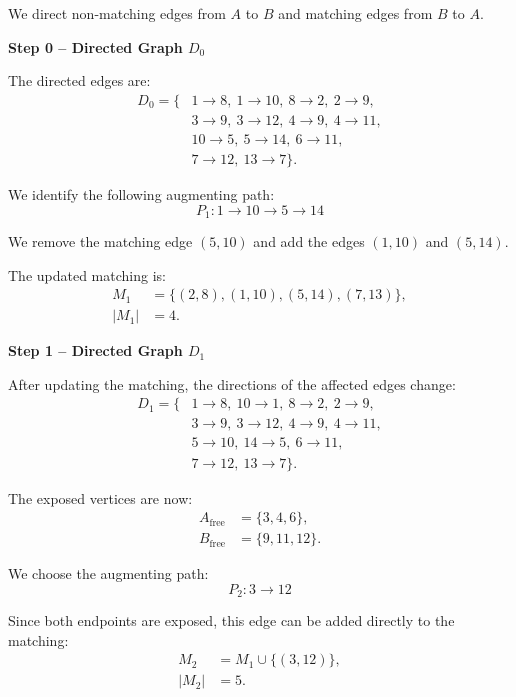 \documentclass{Group_Templ}
\begin{document}
We direct non-matching edges from $A$ to $B$
and matching edges from $B$ to $A$.

\medskip
\noindent\textbf{Step 0 -- Directed Graph $D_0$}

The directed edges are:
\[
\begin{aligned}
	D_0 = \{&
	1\rightarrow 8,\ 1\rightarrow 10,\
	8\rightarrow 2,\ 2\rightarrow 9,\\
	&3\rightarrow 9,\ 3\rightarrow 12,\
	4\rightarrow 9,\ 4\rightarrow 11,\\
	&10\rightarrow 5,\ 5\rightarrow 14,\
	6\rightarrow 11,\\
	&7\rightarrow 12,\ 13\rightarrow 7
	\}.
\end{aligned}
\]

We identify the following augmenting path:
\[
\boxed{
	P_1: 1\rightarrow 10\rightarrow 5\rightarrow 14
}
\]

We remove the matching edge $(5,10)$ and add
the edges $(1,10)$ and $(5,14)$.

The updated matching is:
\[
\begin{aligned}
	M_1 &= \{(2,8),(1,10),(5,14),(7,13)\},\\
	|M_1| &= 4.
\end{aligned}
\]

\medskip
\noindent\textbf{Step 1 -- Directed Graph $D_1$}

After updating the matching, the directions
of the affected edges change:
\[
\begin{aligned}
	D_1 = \{&
	1\rightarrow 8,\ 10\rightarrow 1,\
	8\rightarrow 2,\ 2\rightarrow 9,\\
	&3\rightarrow 9,\ 3\rightarrow 12,\
	4\rightarrow 9,\ 4\rightarrow 11,\\
	&5\rightarrow 10,\ 14\rightarrow 5,\
	6\rightarrow 11,\\
	&7\rightarrow 12,\ 13\rightarrow 7
	\}.
\end{aligned}
\]

The exposed vertices are now:
\[
\begin{aligned}
	A_{\mathrm{free}} &= \{3,4,6\},\\
	B_{\mathrm{free}} &= \{9,11,12\}.
\end{aligned}
\]

We choose the augmenting path:
\[
\boxed{
	P_2: 3\rightarrow 12
}
\]

Since both endpoints are exposed, this edge
can be added directly to the matching:
\[
\begin{aligned}
	M_2 &= M_1\cup\{(3,12)\},\\
	|M_2| &= 5.
\end{aligned}
\]
\end{document}
